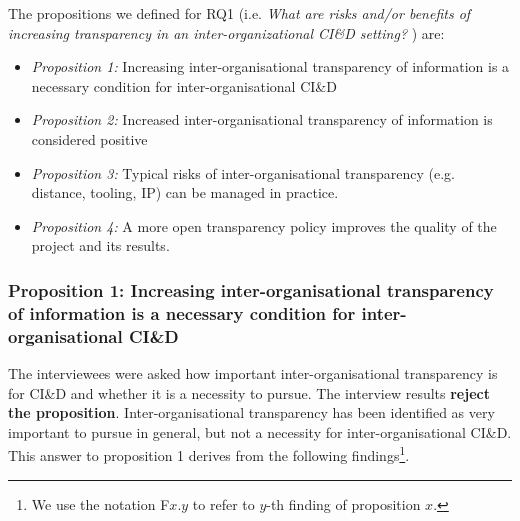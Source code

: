 The propositions we defined for  
RQ1 (i.e. {\em 
{What are risks and/or benefits of increasing  transparency {in an inter-organizational CI\&D setting}?}
}) are:

\begin{itemize}
\item %
\emph{Proposition 1:} Increasing inter-organisational transparency of information is a necessary condition for inter-organisational CI\&D
\item %
\emph{Proposition 2:} Increased inter-organisational transparency of information is considered positive
\item %
\emph{Proposition 3:} %
{Typical risks of inter-organisational transparency (e.g. distance, tooling, IP) can be managed in practice.} 
\item %
\emph{Proposition 4:} A more open transparency policy improves the quality of the project and its results.
\end{itemize}

\subsubsection{Proposition 1: Increasing inter-organisational transparency of information is a necessary condition for inter-organisational CI\&D}

The interviewees were asked how important inter-organisational transparency is for CI\&D and whether it is a necessity to pursue. 
The interview results {\bf reject the proposition}. 
Inter-organisational transparency has been identified as very important to pursue in general, but not a necessity for inter-organisational CI\&D. 
This answer to proposition 1 derives from the following findings\footnote{%
We use the notation F$x$.$y$ to refer to $y$-th finding of proposition $x$.}.

